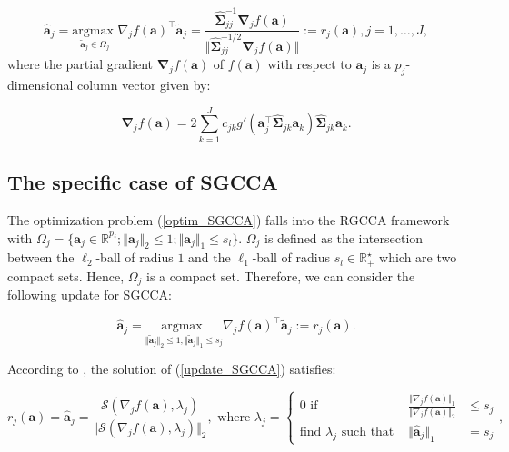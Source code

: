 \documentclass[
]{jss}
\begin{document}
\begin{equation}
\hat{\mathbf{a}}_j = \underset{\tilde{\mathbf{a}}_j\in\Omega_j}{\text{argmax }}  \nabla_j f(\mathbf{a})^\top \tilde{\mathbf{a}}_j = \frac{ \widehat{\mathbf{\Sigma}}_{jj}^{-1} \mathbf \nabla_j f( \mathbf a)}{\Vert  \widehat{\mathbf{\Sigma}}_{jj}^{-1/2} \mathbf \nabla_j f( \mathbf a) \Vert} := r_j( \mathbf a), j=1, \ldots, J,
\label{RGCCA_update}
\end{equation} where the partial gradient
\(\mathbf \nabla_j f( \mathbf a)\) of \(f( \mathbf a)\) with respect to
\(\mathbf a_j\) is a \(p_j\)-dimensional column vector given by:

\begin{equation}
 \mathbf \nabla_j f( \mathbf a)=2\sum_{k=1}^{J}c_{jk}g'\left( \mathbf a_j^\top  \widehat{\mathbf{\Sigma}}_{jk}  \mathbf a_k \right)  \widehat{\mathbf{\Sigma}}_{jk}  \mathbf a_k.
\label{grad_obj_function}
\end{equation}

\subsection{The specific case of
SGCCA}\label{the-specific-case-of-sgcca}

The optimization problem (\ref{optim_SGCCA}) falls into the RGCCA
framework with
\(\Omega_j = \lbrace  \mathbf a_j\in\mathbb{R}^{p_j}; \Vert  \mathbf a_j \Vert_2 \leq 1; \Vert  \mathbf a_j \Vert_1 \leq s_l\rbrace\).
\(\Omega_j\) is defined as the intersection between the \(\ell_2\)-ball
of radius \(1\) and the \(\ell_1\)-ball of radius
\(s_l \in \mathbb{R}_+^\star\) which are two compact sets. Hence,
\(\Omega_j\) is a compact set. Therefore, we can consider the following
update for SGCCA:

\begin{equation}
    \hat{ \mathbf a}_j = \underset{\Vert \tilde{ \mathbf a}_j \Vert_2 \leq 1 ; \Vert \tilde{ \mathbf a}_j \Vert_1 \leq s_j}{\text{argmax }} \nabla_j f( \mathbf a)^\top \tilde{ \mathbf a}_j := r_j( \mathbf a).
\label{update_SGCCA}
\end{equation}

According to \cite{Witten2009a}, the solution of (\ref{update_SGCCA})
satisfies:

\begin{equation}
    r_j( \mathbf a) = \hat{ \mathbf a}_j = \frac{\mathcal{S}(\nabla_j f( \mathbf a), \lambda_j)}{\Vert \mathcal{S}(\nabla_j f( \mathbf a), \lambda_j)\Vert_2}, \text{ where } \lambda_j = \left\lbrace\begin{array}{ccc}
    0 \text{ if } & \frac{\Vert \nabla_j f( \mathbf a) \Vert_1}{\Vert \nabla_j f( \mathbf a) \Vert_2} & \leq s_j\\
    \text{find } \lambda_j \text{ such that } & \Vert \hat{ \mathbf a}_j \Vert_1 & = s_j    \end{array}\right.,
    \label{SGCCA_sol}
\end{equation}
\end{document}
